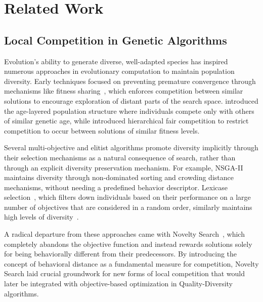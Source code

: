 \section{Related Work}
\label{sec:related-work}
\subsection{Local Competition in Genetic Algorithms}
%
Evolution's ability to generate diverse, well-adapted species has inspired numerous approaches in evolutionary computation to maintain population diversity. Early techniques focused on preventing premature convergence through mechanisms like fitness sharing~\citep{GeneticAlgorithmsSharing1987}, which enforces competition between similar solutions to encourage exploration of distant parts of the search space. \citet{alps} introduced the age-layered population structure where individuals compete only with others of similar genetic age, while \citet{hfc} introduced hierarchical fair competition to restrict competition to occur between solutions of similar fitness levels.

Several multi-objective and elitist algorithms promote diversity implicitly through their selection mechanisms as a natural consequence of search, rather than through an explicit diversity preservation mechanism. For example, NSGA-II~\citep{deb2002fast} maintains diversity through non-dominated sorting and crowding distance mechanisms, without needing a predefined behavior descriptor. Lexicase selection~\citep{helmuth_solving_2015}, which filters down individuals based on their performance on a large number of objectives that are considered in a random order, similarly maintains high levels of diversity~\citep{helmuth2016effects,boldi2024solving}.

A radical departure from these approaches came with Novelty Search~\citep{lehman_AbandoningObjectivesEvolution_2011}, which completely abandons the objective function and instead rewards solutions solely for being behaviorally different from their predecessors. By introducing the concept of behavioral distance as a fundamental measure for competition, Novelty Search laid crucial groundwork for new forms of local competition that would later be integrated with objective-based optimization in Quality-Diversity algorithms. 

